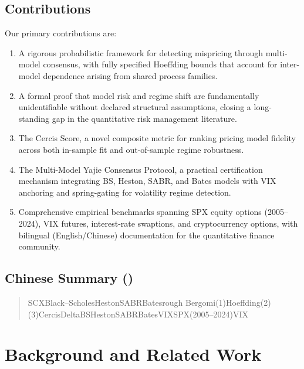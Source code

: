 \documentclass[11pt,a4paper]{article}
\theoremstyle{plain}
\theoremstyle{definition}
\theoremstyle{remark}
\begin{document}
\subsection{Contributions}

Our primary contributions are:

\begin{enumerate}[label=(C\arabic*), leftmargin=*]
  \item A rigorous probabilistic framework for detecting mispricing through multi-model consensus, with fully specified Hoeffding bounds that account for inter-model dependence arising from shared process families.
  \item A formal proof that model risk and regime shift are fundamentally unidentifiable without declared structural assumptions, closing a long-standing gap in the quantitative risk management literature.
  \item The Cercis Score, a novel composite metric for ranking pricing model fidelity across both in-sample fit and out-of-sample regime robustness.
  \item The Multi-Model Yajie Consensus Protocol, a practical certification mechanism integrating BS, Heston, SABR, and Bates models with VIX anchoring and spring-gating for volatility regime detection.
  \item Comprehensive empirical benchmarks spanning SPX equity options (2005--2024), VIX futures, interest-rate swaptions, and cryptocurrency options, with bilingual (English/Chinese) documentation for the quantitative finance community.
\end{enumerate}

\subsection{Chinese Summary ()}

\begin{quote}
\small
SCXBlack--ScholesHestonSABRBatesrough Bergomi(1)Hoeffding(2)(3)CercisDeltaBSHestonSABRBatesVIXSPX(2005--2024)VIX
\end{quote}

\section{Background and Related Work}
\end{document}
